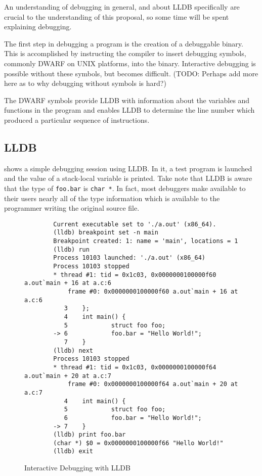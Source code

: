 \documentclass[twocolumn,draft]{article}
\begin{document}
An understanding of debugging in general, and about LLDB specifically are
crucial to the understanding of this proposal, so some time will be spent
explaining debugging.

The first step in debugging a program is the creation of a debuggable binary.
This is accomplished by instructing the compiler to insert debugging symbols,
commonly DWARF on UNIX platforms, into the binary. Interactive debugging is
possible without these symbols, but becomes difficult. (TODO: Perhaps add more
here as to why debugging without symbols is hard?)

The DWARF symbols provide LLDB with information about the variables and
functions in the program and enables LLDB to determine the line number which
produced a particular sequence of instructions.

\subsection{LLDB}
 shows a simple debugging session using LLDB. In it, a test
program is launched and the value of a stack-local variable is printed. Take
note that LLDB is aware that the type of \texttt{foo.bar} is \texttt{char *}. In
fact, most debuggers make available to their users nearly all of the type
information which is available to the programmer writing the original source file.

\begin{figure*}[p]
	\begin{verbatim}
		Current executable set to './a.out' (x86_64).
		(lldb) breakpoint set -n main
		Breakpoint created: 1: name = 'main', locations = 1
		(lldb) run
		Process 10103 launched: './a.out' (x86_64)
		Process 10103 stopped
		* thread #1: tid = 0x1c03, 0x0000000100000f60 a.out`main + 16 at a.c:6
		    frame #0: 0x0000000100000f60 a.out`main + 16 at a.c:6
		   3    };
		   4    int main() {
		   5            struct foo foo;
		-> 6            foo.bar = "Hello World!";
		   7    }
		(lldb) next
		Process 10103 stopped
		* thread #1: tid = 0x1c03, 0x0000000100000f64 a.out`main + 20 at a.c:7
		    frame #0: 0x0000000100000f64 a.out`main + 20 at a.c:7
		   4    int main() {
		   5            struct foo foo;
		   6            foo.bar = "Hello World!";
		-> 7    }
		(lldb) print foo.bar
		(char *) $0 = 0x0000000100000f66 "Hello World!"
		(lldb) exit
	\end{verbatim}
	\caption{Interactive Debugging with LLDB}
	\label{fig:debugging}
\end{figure*}
\end{document}
